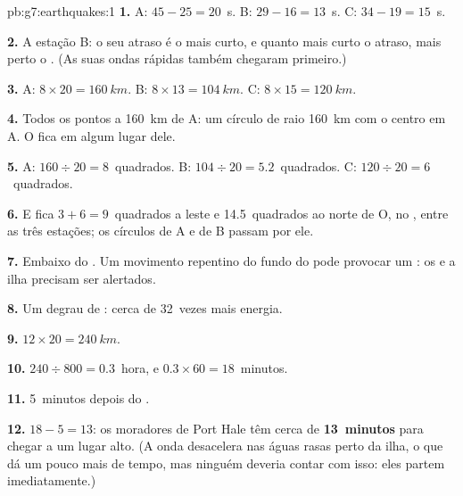 \begin{solution}{pb:g7:earthquakes:1}
\textbf{1.} A: $45 - 25 = 20$~s. B: $29 - 16 = 13$~s. C: $34 - 19 =
15$~s.

\textbf{2.} A estação B: o seu atraso é o mais curto, e quanto mais curto
o atraso, mais perto o . (As suas ondas rápidas também chegaram
primeiro.)

\textbf{3.} A: $8 \times 20 = \qty{160}{km}$. B: $8 \times 13 =
\qty{104}{km}$. C: $8 \times 15 = \qty{120}{km}$.

\textbf{4.} Todos os pontos a \qty{160}{km} de A: um círculo de raio
\qty{160}{km} com o centro em A. O  fica em algum lugar dele.

\textbf{5.} A: $160 \div 20 = 8$~quadrados. B: $104 \div 20 = 5.2$~quadrados.
C: $120 \div 20 = 6$~quadrados.

\textbf{6.} E fica $3 + 6 = 9$~quadrados a leste e 14.5~quadrados ao norte
de O, no , entre as três estações; os círculos de A e de B passam por
ele.

\textbf{7.} Embaixo do . Um movimento repentino do fundo do  pode
provocar um : os  e a ilha precisam ser alertados.

\textbf{8.} Um degrau de : cerca de 32~vezes mais energia.

\textbf{9.} $12 \times 20 = \qty{240}{km}$.

\textbf{10.} $240 \div 800 = 0.3$~hora, e $0.3 \times 60 = 18$~minutos.

\textbf{11.} 5~minutos depois do .

\textbf{12.} $18 - 5 = 13$: os moradores de Port Hale têm cerca de
\textbf{13~minutos} para chegar a um lugar alto. (A onda desacelera nas
águas rasas perto da ilha, o que dá um pouco mais de tempo, mas ninguém
deveria contar com isso: eles partem imediatamente.)
\end{solution}
